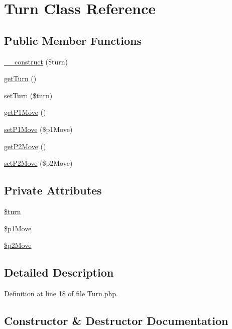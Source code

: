 \hypertarget{class_turn}{}\section{Turn Class Reference}
\label{class_turn}
\subsection*{Public Member Functions}
\begin{DoxyCompactItemize}
\item 
\hyperlink{class_turn_a42d7ea2a43ba5ba3892e620b31ddf31d}{\+\_\+\+\_\+construct} (\$turn)
\item 
\hyperlink{class_turn_a1ec561736bfb37b5ce0a6d68d2fb1c8d}{get\+Turn} ()
\item 
\hyperlink{class_turn_a351e3aad313cb333f1e092f98834a5bb}{set\+Turn} (\$turn)
\item 
\hyperlink{class_turn_a1992de1a6621d3034816c0c85b9fccd2}{get\+P1\+Move} ()
\item 
\hyperlink{class_turn_a5b0784c88b0fc19df50ec6a426efeb5c}{set\+P1\+Move} (\$p1\+Move)
\item 
\hyperlink{class_turn_a1972418b9242347a2d0b827c1d428c2c}{get\+P2\+Move} ()
\item 
\hyperlink{class_turn_a39595ef14272a1469810b2f12552d1e5}{set\+P2\+Move} (\$p2\+Move)
\end{DoxyCompactItemize}
\subsection*{Private Attributes}
\begin{DoxyCompactItemize}
\item 
\hyperlink{class_turn_afc3c495aebde512047a24ca6b318e4d3}{\$turn}
\item 
\hyperlink{class_turn_a7cd1750347da006bd657af23cacc47d2}{\$p1\+Move}
\item 
\hyperlink{class_turn_a51e1e51c706caa00d7caf6e8470c2eb6}{\$p2\+Move}
\end{DoxyCompactItemize}


\subsection{Detailed Description}


Definition at line 18 of file Turn.\+php.



\subsection{Constructor \& Destructor Documentation}
\mbox{\label{class_turn_a42d7ea2a43ba5ba3892e620b31ddf31d}} 
